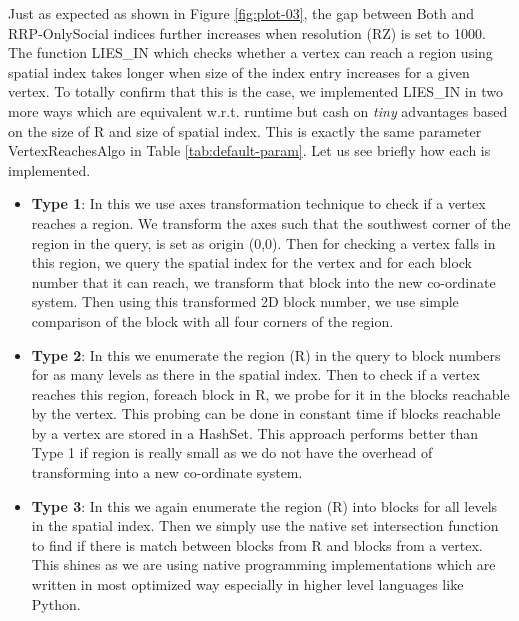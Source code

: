 Just as expected as shown in Figure \ref{fig:plot-03}, the gap between Both and RRP-OnlySocial indices further increases when resolution (RZ) is set to 1000. The function LIES\_IN which checks whether a vertex can reach a region using spatial index takes longer when size of the index entry increases for a given vertex. To totally confirm that this is the case, we implemented LIES\_IN in two more ways which are equivalent w.r.t. runtime but cash on \textit{tiny} advantages based on the size of R and size of spatial index. This is exactly the same parameter VertexReachesAlgo in Table \ref{tab:default-param}. Let us see briefly how each is implemented.
\begin{itemize}
  \item \textbf{Type 1}: In this we use axes transformation technique to check if a vertex reaches a region. We transform the axes such that the southwest corner of the region in the query, is set as origin (0,0). Then for checking a vertex falls in this region, we query the spatial index for the vertex and for each block number that it can reach, we transform that block into the new co-ordinate system. Then using this transformed 2D block number, we use simple comparison of the block with all four corners of the region.
  \item \textbf{Type 2}: In this we enumerate the region (R) in the query to block numbers for as many levels as there in the spatial index. Then to check if a vertex reaches this region, foreach block in R, we probe for it in the blocks reachable by the vertex. This probing can be done in constant time if blocks reachable by a vertex are stored in a HashSet. This approach performs better than Type 1 if region is really small as we do not have the overhead of transforming into a new co-ordinate system.
  \item \textbf{Type 3}: In this we again enumerate the region (R) into blocks for all levels in the spatial index. Then we simply use the native set intersection function to find if there is match between blocks from R and blocks from a vertex. This shines as we are using native programming implementations which are written in most optimized way especially in higher level languages like Python.
\end{itemize}



